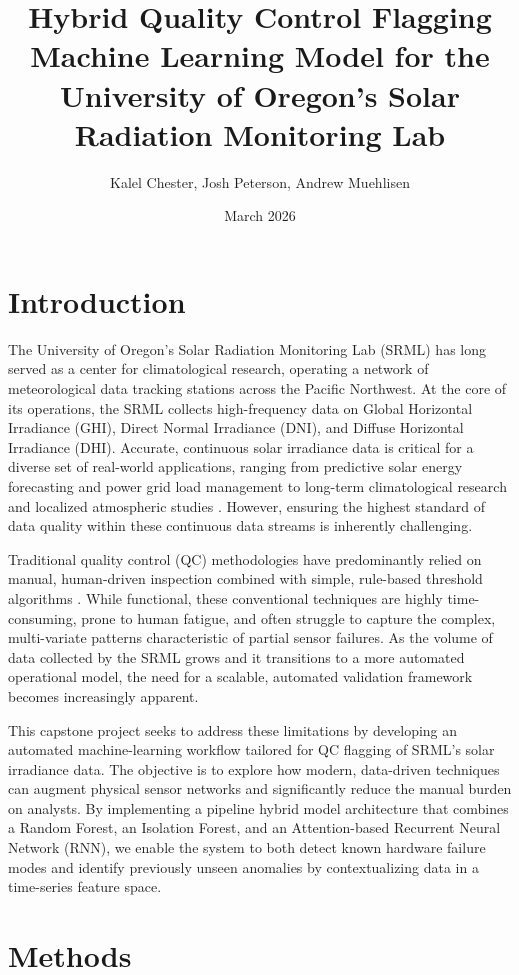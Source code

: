\documentclass[12pt]{article}
\title{Hybrid Quality Control Flagging Machine Learning Model for the University of Oregon's Solar Radiation Monitoring Lab}
\author{Kalel Chester, Josh Peterson, Andrew Muehlisen}
\date{March 2026}
\begin{document}
\maketitle

\section*{Introduction}

The University of Oregon's Solar Radiation Monitoring Lab (SRML) has long served as a center for climatological research, operating a network of meteorological data tracking stations across the Pacific Northwest. At the core of its operations, the SRML collects high-frequency data on Global Horizontal Irradiance (GHI), Direct Normal Irradiance (DNI), and Diffuse Horizontal Irradiance (DHI). Accurate, continuous solar irradiance data is critical for a diverse set of real-world applications, ranging from predictive solar energy forecasting and power grid load management to long-term climatological research and localized atmospheric studies \cite{alizamir2023improving}. However, ensuring the highest standard of data quality within these continuous data streams is inherently challenging. 

Traditional quality control (QC) methodologies have predominantly relied on manual, human-driven inspection combined with simple, rule-based threshold algorithms \cite{maxwell1993users}. While functional, these conventional techniques are highly time-consuming, prone to human fatigue, and often struggle to capture the complex, multi-variate patterns characteristic of partial sensor failures. As the volume of data collected by the SRML grows and it transitions to a more automated operational model, the need for a scalable, automated validation framework becomes increasingly apparent.

This capstone project seeks to address these limitations by developing an automated machine-learning workflow tailored for QC flagging of SRML's solar irradiance data. The objective is to explore how modern, data-driven techniques can augment physical sensor networks and significantly reduce the manual burden on analysts. By implementing a pipeline hybrid model architecture that combines a Random Forest, an Isolation Forest, and an Attention-based Recurrent Neural Network (RNN), we enable the system to both detect known hardware failure modes and identify previously unseen anomalies by contextualizing data in a time-series feature space.

\section*{Methods}
\end{document}
